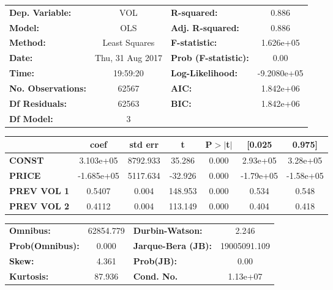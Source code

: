 \begin{center}
\begin{tabular}{lclc}
\toprule
\textbf{Dep. Variable:}    &        VOL         & \textbf{  R-squared:         } &      0.886    \\
\textbf{Model:}            &       OLS        & \textbf{  Adj. R-squared:    } &      0.886    \\
\textbf{Method:}           &  Least Squares   & \textbf{  F-statistic:       } &  1.626e+05    \\
\textbf{Date:}             & Thu, 31 Aug 2017 & \textbf{  Prob (F-statistic):} &      0.00     \\
\textbf{Time:}             &     19:59:20     & \textbf{  Log-Likelihood:    } & -9.2080e+05   \\
\textbf{No. Observations:} &       62567      & \textbf{  AIC:               } &  1.842e+06    \\
\textbf{Df Residuals:}     &       62563      & \textbf{  BIC:               } &  1.842e+06    \\
\textbf{Df Model:}         &           3      & \textbf{                     } &               \\
\bottomrule
\end{tabular}
\begin{tabular}{lcccccc}
               & \textbf{coef} & \textbf{std err} & \textbf{t} & \textbf{P$>$$|$t$|$} & \textbf{[0.025} & \textbf{0.975]}  \\
\midrule
\textbf{CONST} &    3.103e+05  &     8792.933     &    35.286  &         0.000        &     2.93e+05    &     3.28e+05     \\
\textbf{PRICE}    &   -1.685e+05  &     5117.634     &   -32.926  &         0.000        &    -1.79e+05    &    -1.58e+05     \\
\textbf{PREV VOL 1}    &       0.5407  &        0.004     &   148.953  &         0.000        &        0.534    &        0.548     \\
\textbf{PREV VOL 2}    &       0.4112  &        0.004     &   113.149  &         0.000        &        0.404    &        0.418     \\
\bottomrule
\end{tabular}
\begin{tabular}{lclc}
\textbf{Omnibus:}       & 62854.779 & \textbf{  Durbin-Watson:     } &      2.246    \\
\textbf{Prob(Omnibus):} &    0.000  & \textbf{  Jarque-Bera (JB):  } & 19005091.109  \\
\textbf{Skew:}          &    4.361  & \textbf{  Prob(JB):          } &       0.00    \\
\textbf{Kurtosis:}      &   87.936  & \textbf{  Cond. No.          } &   1.13e+07    \\
\bottomrule
\end{tabular}
\end{center} 
